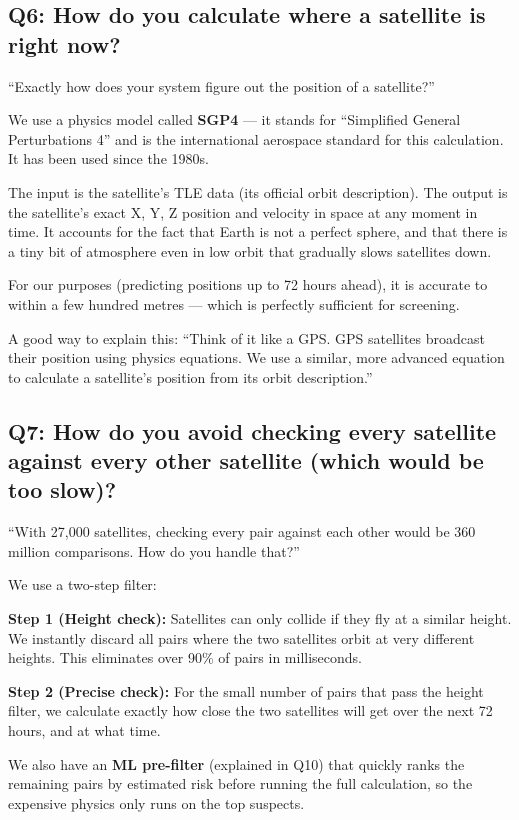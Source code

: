 \documentclass[11pt,a4paper]{article}
\begin{document}
\subsection*{Q6: How do you calculate where a satellite is right now?}

\begin{questionbox}
``Exactly how does your system figure out the position of a satellite?''
\end{questionbox}

\begin{answerbox}
We use a physics model called \textbf{SGP4} --- it stands for ``Simplified General Perturbations 4'' and is the international aerospace standard for this calculation. It has been used since the 1980s.

The input is the satellite's TLE data (its official orbit description). The output is the satellite's exact X, Y, Z position and velocity in space at any moment in time. It accounts for the fact that Earth is not a perfect sphere, and that there is a tiny bit of atmosphere even in low orbit that gradually slows satellites down.

For our purposes (predicting positions up to 72 hours ahead), it is accurate to within a few hundred metres --- which is perfectly sufficient for screening.
\end{answerbox}

\begin{tipbox}
A good way to explain this: ``Think of it like a GPS. GPS satellites broadcast their position using physics equations. We use a similar, more advanced equation to calculate a satellite's position from its orbit description.''
\end{tipbox}

\vspace{1em}
\subsection*{Q7: How do you avoid checking every satellite against every other satellite (which would be too slow)?}

\begin{questionbox}
``With 27,000 satellites, checking every pair against each other would be 360 million comparisons. How do you handle that?''
\end{questionbox}

\begin{answerbox}
We use a two-step filter:

\textbf{Step 1 (Height check):} Satellites can only collide if they fly at a similar height. We instantly discard all pairs where the two satellites orbit at very different heights. This eliminates over 90\% of pairs in milliseconds.

\textbf{Step 2 (Precise check):} For the small number of pairs that pass the height filter, we calculate exactly how close the two satellites will get over the next 72 hours, and at what time.

We also have an \textbf{ML pre-filter} (explained in Q10) that quickly ranks the remaining pairs by estimated risk before running the full calculation, so the expensive physics only runs on the top suspects.
\end{answerbox}
\end{document}
